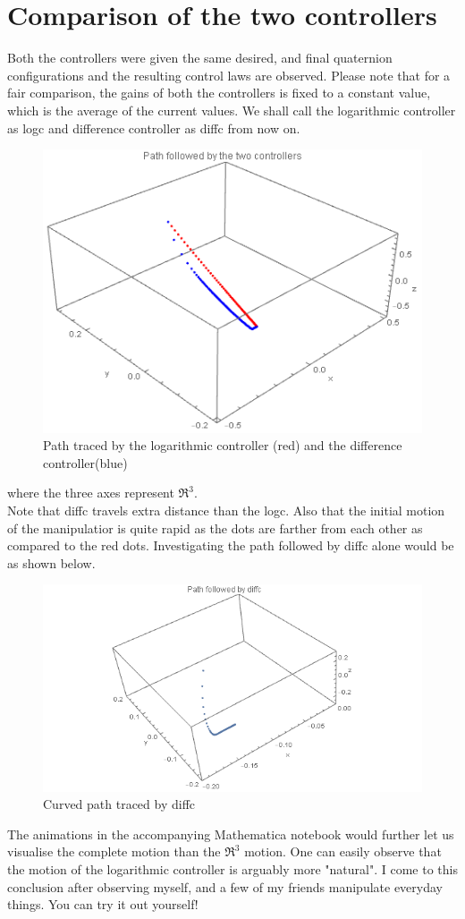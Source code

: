 \documentclass[a4paper,12pt]{article}
\begin{document}
\section{Comparison of the two controllers}
Both the controllers were given the same desired, and final quaternion configurations and the resulting control laws are observed. Please note that for a fair comparison, the gains of both the controllers is fixed to a constant value, which is the average of the current values. We shall call the logarithmic controller as logc and difference controller as diffc from now on.
\begin{figure}[H]
	\centering
	\includegraphics[scale=0.7]{dqc_comparison_path}
	\caption{Path traced by the logarithmic controller (red) and the difference controller(blue)}
	\label{fg:dqc_comparison}
\end{figure}
where the three axes represent $\Re^3$.\\
Note that diffc travels extra distance than the logc. Also that the initial motion of the manipulatior is quite rapid as the dots are farther from each other as compared to the red dots. Investigating the path followed by diffc alone would be as shown below. 
\begin{figure}[H]
	\centering
	\includegraphics[scale=0.8]{dqc_diffc_path}
	\caption{Curved path traced by diffc}
	\label{fg:dqc_diffc_path}
\end{figure}
The animations in the accompanying Mathematica notebook would further let us visualise the complete \SE motion than the $\Re^3$ motion. One can easily observe that the motion of the logarithmic controller is arguably more "natural". I come to this conclusion after observing myself, and a few of my friends manipulate everyday things. You can try it out yourself!
\end{document}
